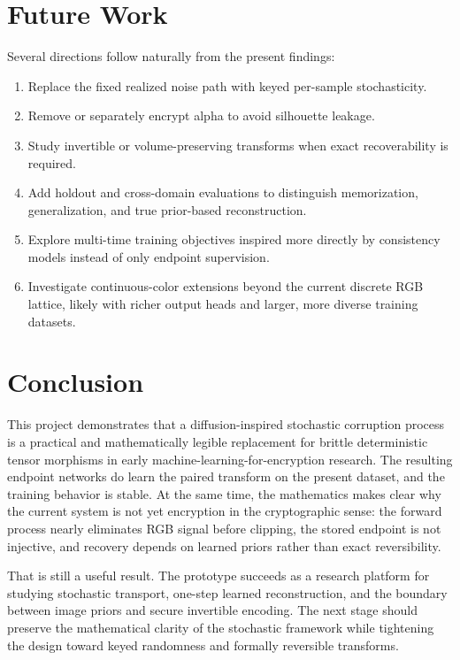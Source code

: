 \documentclass[11pt]{article}
\begin{document}
\section{Future Work}
Several directions follow naturally from the present findings:
\begin{enumerate}
    \item Replace the fixed realized noise path with keyed per-sample stochasticity.
    \item Remove or separately encrypt alpha to avoid silhouette leakage.
    \item Study invertible or volume-preserving transforms when exact recoverability is required.
    \item Add holdout and cross-domain evaluations to distinguish memorization, generalization, and true prior-based reconstruction.
    \item Explore multi-time training objectives inspired more directly by consistency models instead of only endpoint supervision.
    \item Investigate continuous-color extensions beyond the current discrete RGB lattice, likely with richer output heads and larger, more diverse training datasets.
\end{enumerate}

\section{Conclusion}
This project demonstrates that a diffusion-inspired stochastic corruption process is a practical and mathematically legible replacement for brittle deterministic tensor morphisms in early machine-learning-for-encryption research. The resulting endpoint networks do learn the paired transform on the present dataset, and the training behavior is stable. At the same time, the mathematics makes clear why the current system is not yet encryption in the cryptographic sense: the forward process nearly eliminates RGB signal before clipping, the stored endpoint is not injective, and recovery depends on learned priors rather than exact reversibility.

That is still a useful result. The prototype succeeds as a research platform for studying stochastic transport, one-step learned reconstruction, and the boundary between image priors and secure invertible encoding. The next stage should preserve the mathematical clarity of the stochastic framework while tightening the design toward keyed randomness and formally reversible transforms.
\end{document}
